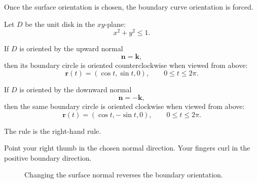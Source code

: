 Once the surface orientation is chosen, the boundary curve orientation is forced.

\begin{example}
Let \(D\) be the unit disk in the \(xy\)-plane:
\[
    x^2+y^2\le1.
\]

If \(D\) is oriented by the upward normal
\[
    \mathbf n=\mathbf k,
\]
then its boundary circle is oriented counterclockwise when viewed from above:
\[
    \mathbf r(t)=(\cos t,\sin t,0),
    \qquad
    0\le t\le2\pi.
\]

If \(D\) is oriented by the downward normal
\[
    \mathbf n=-\mathbf k,
\]
then the same boundary circle is oriented clockwise when viewed from above:
\[
    \mathbf r(t)=(\cos t,-\sin t,0),
    \qquad
    0\le t\le2\pi.
\]
\end{example}

The rule is the right-hand rule.

Point your right thumb in the chosen normal direction.  Your fingers curl in the positive
boundary direction.

\begin{figure}[h]
\centering
{}
\caption{Changing the surface normal reverses the boundary orientation.}
\end{figure}

